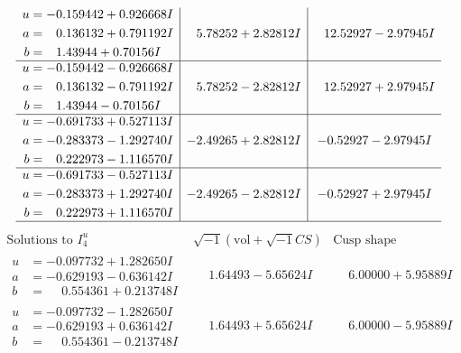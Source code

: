 \documentclass[1p]{elsarticle_modified}
\theoremstyle{definition}
\newcommand{\I}{\sqrt{-1}}
\begin{document}
$$\begin{array}{c|c|c}
\begin{aligned}
u &= -0.159442 + 0.926668 I \\
a &= \phantom{-}0.136132 + 0.791192 I \\
b &= \phantom{-}1.43944 + 0.70156 I\end{aligned}
 & \phantom{-}5.78252 + 2.82812 I & \phantom{-}12.52927 - 2.97945 I \\ \hline\begin{aligned}
u &= -0.159442 - 0.926668 I \\
a &= \phantom{-}0.136132 - 0.791192 I \\
b &= \phantom{-}1.43944 - 0.70156 I\end{aligned}
 & \phantom{-}5.78252 - 2.82812 I & \phantom{-}12.52927 + 2.97945 I \\ \hline\begin{aligned}
u &= -0.691733 + 0.527113 I \\
a &= -0.283373 - 1.292740 I \\
b &= \phantom{-}0.222973 - 1.116570 I\end{aligned}
 & -2.49265 + 2.82812 I & -0.52927 - 2.97945 I \\ \hline\begin{aligned}
u &= -0.691733 - 0.527113 I \\
a &= -0.283373 + 1.292740 I \\
b &= \phantom{-}0.222973 + 1.116570 I\end{aligned}
 & -2.49265 - 2.82812 I & -0.52927 + 2.97945 I\\
 \hline 
 \end{array}$$\newpage$$\begin{array}{c|c|c}  
\text{Solutions to }I^u_{4}& \I (\text{vol} + \sqrt{-1}CS) & \text{Cusp shape}\\
 \hline 
\begin{aligned}
u &= -0.097732 + 1.282650 I \\
a &= -0.629193 - 0.636142 I \\
b &= \phantom{-}0.554361 + 0.213748 I\end{aligned}
 & \phantom{-}1.64493 - 5.65624 I & \phantom{-}6.00000 + 5.95889 I \\ \hline\begin{aligned}
u &= -0.097732 - 1.282650 I \\
a &= -0.629193 + 0.636142 I \\
b &= \phantom{-}0.554361 - 0.213748 I\end{aligned}
 & \phantom{-}1.64493 + 5.65624 I & \phantom{-}6.00000 - 5.95889 I \\ \hline\begin{aligned}

\end{aligned}
\end{array}$$
\end{document}
